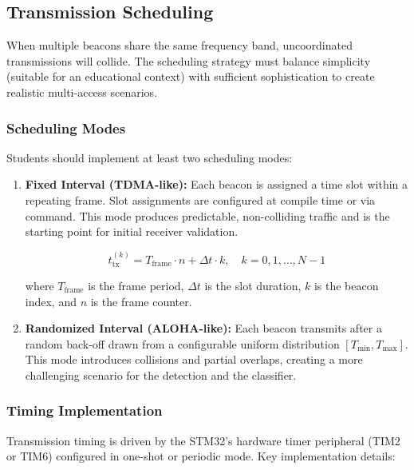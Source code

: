 \documentclass[11pt,letterpaper]{article}
\begin{document}
	\subsection{Transmission Scheduling}
	
	When multiple beacons share the same frequency band, uncoordinated transmissions will collide. The scheduling strategy must balance simplicity (suitable for an educational context) with sufficient sophistication to create realistic multi-access scenarios.
	
	\subsubsection{Scheduling Modes}
	
	Students should implement at least two scheduling modes:
	
	\begin{enumerate}[leftmargin=2em]
		\item \textbf{Fixed Interval (TDMA-like):} Each beacon is assigned a time slot within a repeating frame. Slot assignments are configured at compile time or via \UART{} command. This mode produces predictable, non-colliding traffic and is the starting point for initial receiver validation.
		
		\begin{equation}
			t_{\text{tx}}^{(k)} = T_{\text{frame}} \cdot n + \Delta t \cdot k, \quad k = 0, 1, \ldots, N-1
			\label{eq:tdma}
		\end{equation}
		
		where $T_{\text{frame}}$ is the frame period, $\Delta t$ is the slot duration, $k$ is the beacon index, and $n$ is the frame counter.
		
		\item \textbf{Randomized Interval (ALOHA-like):} Each beacon transmits after a random back-off drawn from a configurable uniform distribution $[T_{\min}, T_{\max}]$. This mode introduces collisions and partial overlaps, creating a more challenging scenario for the \FPGA{} detection and the \ML{} classifier.
	\end{enumerate}
	
	\subsubsection{Timing Implementation}
	
	Transmission timing is driven by the STM32's hardware timer peripheral (TIM2 or TIM6) configured in one-shot or periodic mode. Key implementation details:
	
\end{document}

